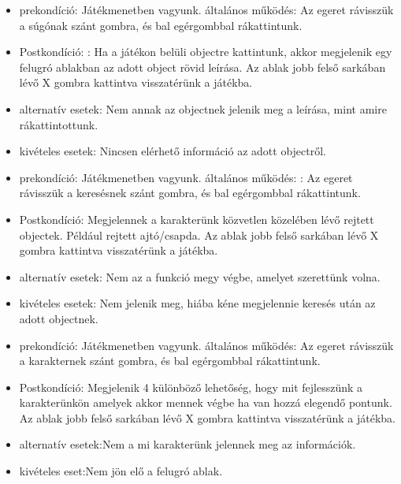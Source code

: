
\begin{itemize}
    \item prekondíció: Játékmenetben vagyunk.
    általános működés: Az egeret rávisszük a súgónak szánt gombra, és bal egérgombbal rákattintunk.
    \item Postkondíció: : Ha a játékon belüli objectre kattintunk, akkor megjelenik egy felugró ablakban az adott object rövid leírása. Az ablak jobb felső sarkában lévő X gombra kattintva visszatérünk a játékba.
    \item alternatív esetek: Nem annak az objectnek jelenik meg a leírása, mint amire rákattintottunk.
    \item kivételes esetek: Nincsen elérhető információ az adott objectről.
\end{itemize}


\begin{itemize}
    \item prekondíció: Játékmenetben vagyunk.
    általános működés: : Az egeret rávisszük a keresésnek szánt gombra, és bal egérgombbal rákattintunk.
    \item Postkondíció: Megjelennek a karakterünk közvetlen közelében lévő rejtett objectek. Például rejtett ajtó/csapda. Az ablak jobb felső sarkában lévő X gombra kattintva visszatérünk a játékba.
    \item alternatív esetek: Nem az a funkció megy végbe, amelyet szerettünk volna.
    \item kivételes esetek: Nem jelenik meg, hiába kéne megjelennie keresés után az adott objectnek.
\end{itemize}


\begin{itemize}
    \item prekondíció: Játékmenetben vagyunk.
    általános működés: Az egeret rávisszük a karakternek szánt gombra, és bal egérgombbal rákattintunk.
    \item Postkondíció: Megjelenik 4 különböző lehetőség, hogy mit fejlesszünk a karakterünkön amelyek akkor mennek végbe ha van hozzá elegendő pontunk. Az ablak jobb felső sarkában lévő X gombra kattintva visszatérünk a játékba.
    \item alternatív esetek:Nem a mi karakterünk jelennek meg az információk.
    \item kivételes eset:Nem jön elő a felugró ablak.
\end{itemize}
